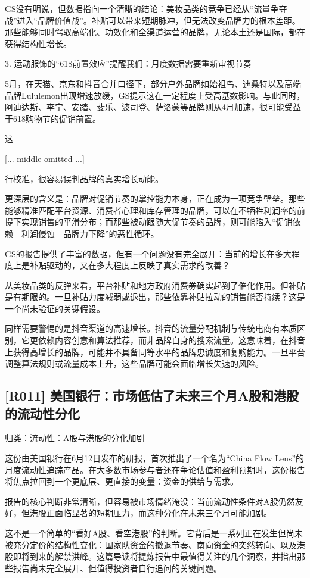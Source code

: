 \documentclass[11pt]{ctexart}
\begin{document}
GS没有明说，但数据指向一个清晰的结论：美妆品类的竞争已经从“流量争夺战”进入“品牌价值战”。补贴可以带来短期脉冲，但无法改变品牌力的根本差距。那些能够同时驾驭高端化、功效化和全渠道运营的品牌，无论本土还是国际，都在获得结构性增长。

3. 运动服饰的“618前置效应”提醒我们：月度数据需要重新审视节奏

5月，在天猫、京东和抖音合并口径下，部分户外品牌如始祖鸟、迪桑特以及高端品牌Lululemon出现增速放缓，GS提示这在一定程度上受高基数影响。与此同时，阿迪达斯、李宁、安踏、斐乐、波司登、萨洛蒙等品牌则从4月加速，很可能受益于618购物节的促销前置。

这

[... middle omitted ...]

行校准，很容易误判品牌的真实增长动能。

更深层的含义是：品牌对促销节奏的掌控能力本身，正在成为一项竞争壁垒。那些能够精准匹配平台资源、消费者心理和库存管理的品牌，可以在不牺牲利润率的前提下实现销售的平滑分布；而那些被动跟随大促节奏的品牌，则可能陷入“促销依赖—利润侵蚀—品牌力下降”的恶性循环。

GS的报告提供了丰富的数据，但有一个问题没有完全展开：当前的增长在多大程度上是补贴驱动的，又在多大程度上反映了真实需求的改善？

从美妆品类的反弹来看，平台补贴和地方政府消费券确实起到了催化作用。但补贴是有期限的。一旦补贴力度减弱或退出，那些依靠补贴拉动的销售能否持续？这是一个尚未验证的关键假设。

同样需要警惕的是抖音渠道的高速增长。抖音的流量分配机制与传统电商有本质区别，它更依赖内容创意和算法推荐，而非品牌自身的搜索流量。这意味着，在抖音上获得高增长的品牌，可能并不具备同等水平的品牌忠诚度和复购能力。一旦平台调整算法规则或流量成本上升，这些品牌可能会面临增长失速的风险。

\subsection{[R011] 美国银行：市场低估了未来三个月A股和港股的流动性分化}
{\small\color{refgray}归类：流动性：A股与港股的分化加剧}

这份由美国银行在6月12日发布的研报，首次推出了一个名为“China Flow Lens”的月度流动性追踪产品。在大多数市场参与者还在争论估值和盈利预期时，这份报告将焦点拉回到一个更底层、更直接的变量：资金的供给与需求。

报告的核心判断非常清晰，但容易被市场情绪淹没：当前流动性条件对A股仍然友好，但港股正面临显著的短期压力，而这种分化在未来三个月可能加剧。

这不是一个简单的“看好A股、看空港股”的判断。它背后是一系列正在发生但尚未被充分定价的结构性变化：国家队资金的撤退节奏、南向资金的突然转向、以及港股即将到来的解禁洪峰。这篇导读将提炼报告中最值得关注的几个洞察，并指出那些报告尚未完全展开、但值得投资者自行追问的关键问题。
\end{document}

